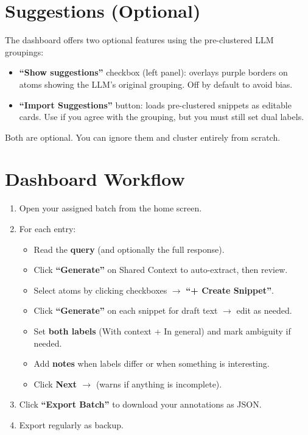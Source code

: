 \documentclass{article}
\begin{document}
\section{Suggestions (Optional)}
\label{sec:suggestions}

The dashboard offers two optional features using the pre-clustered LLM groupings:
\begin{itemize}[leftmargin=*,itemsep=2pt]
    \item \textbf{``Show suggestions''} checkbox (left panel): overlays purple borders on atoms showing the LLM's original grouping. Off by default to avoid bias.
    \item \textbf{``Import Suggestions''} button: loads pre-clustered snippets as editable cards. Use if you agree with the grouping, but you must still set dual labels.
\end{itemize}
Both are optional. You can ignore them and cluster entirely from scratch.


\section{Dashboard Workflow}
\label{sec:workflow}

\begin{enumerate}[leftmargin=*,itemsep=2pt]
    \item Open your assigned batch from the home screen.
    \item For each entry:
        \begin{itemize}[leftmargin=*,itemsep=1pt]
            \item Read the \textbf{query} (and optionally the full response).
            \item Click \textbf{``Generate''} on Shared Context to auto-extract, then review.
            \item Select atoms by clicking checkboxes $\rightarrow$ \textbf{``+ Create Snippet''}.
            \item Click \textbf{``Generate''} on each snippet for draft text $\rightarrow$ edit as needed.
            \item Set \textbf{both labels} (With context + In general) and mark ambiguity if needed.
            \item Add \textbf{notes} when labels differ or when something is interesting.
            \item Click \textbf{Next $\rightarrow$} (warns if anything is incomplete).
        \end{itemize}
    \item Click \textbf{``Export Batch''} to download your annotations as JSON.
    \item Export regularly as backup.
\end{enumerate}
\end{document}
